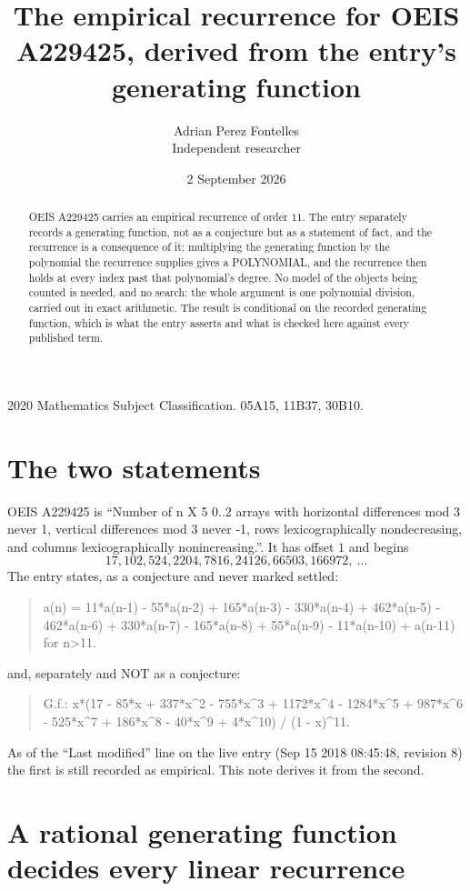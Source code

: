 \documentclass[11pt,a4paper]{article}
\title{The empirical recurrence for OEIS A229425, derived from the entry's generating function}
\author{Adrian Perez Fontelles\\ \small Independent researcher}
\date{2 September 2026}
\theoremstyle{plain}
\theoremstyle{definition}
\begin{document}
\maketitle

\begin{abstract}
OEIS A229425 carries an empirical recurrence of order $11$. The entry separately records a
generating function, not as a conjecture but as a statement of fact, and the recurrence is a
consequence of it: multiplying the generating function by the polynomial the recurrence
supplies gives a POLYNOMIAL, and the recurrence then holds at every index past that
polynomial's degree. No model of the objects being counted is needed, and no search: the
whole argument is one polynomial division, carried out in exact arithmetic. The result is
conditional on the recorded generating function, which is what the entry asserts and what is
checked here against every published term.
\end{abstract}

\noindent\small 2020 Mathematics Subject Classification. 05A15, 11B37, 30B10.\normalsize

\section{The two statements}

OEIS A229425 is ``Number of n X 5 0..2 arrays with horizontal differences mod 3 never 1, vertical differences mod 3 never -1, rows lexicographically nondecreasing, and columns lexicographically nonincreasing.''. It has offset $1$ and begins
\[
17, 102, 524, 2204, 7816, 24126, 66503, 166972,\ \dots
\]
The entry states, as a conjecture and never marked settled:
\begin{quote}
a(n) = 11*a(n-1) - 55*a(n-2) + 165*a(n-3) - 330*a(n-4) + 462*a(n-5) - 462*a(n-6) + 330*a(n-7) - 165*a(n-8) + 55*a(n-9) - 11*a(n-10) + a(n-11) for n>11.
\end{quote}
and, separately and NOT as a conjecture:
\begin{quote}
G.f.: x*(17 - 85*x + 337*x\^{}2 - 755*x\^{}3 + 1172*x\^{}4 - 1284*x\^{}5 + 987*x\^{}6 - 525*x\^{}7 + 186*x\^{}8 - 40*x\^{}9 + 4*x\^{}10) / (1 - x)\^{}11.
\end{quote}
As of the ``Last modified'' line on the live entry (Sep 15 2018 08:45:48, revision 8) the first is still
recorded as empirical. This note derives it from the second.

\section{A rational generating function decides every linear recurrence}
\end{document}
